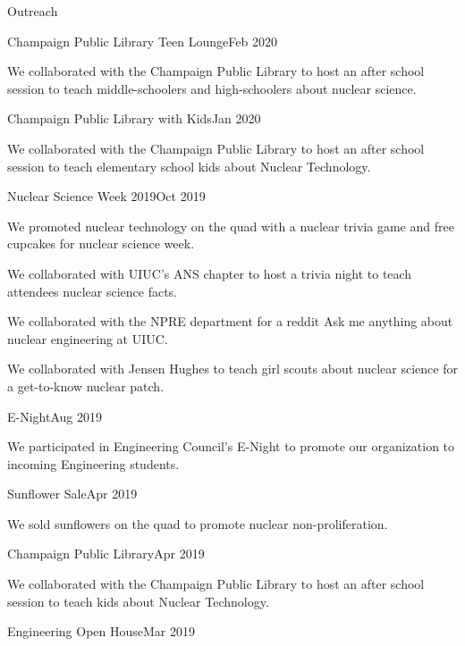 \documentclass{resume2} %
\begin{document}
\begin{rSection}{Outreach}
	\begin{rSubsection}{Champaign Public Library Teen Lounge}{Feb 2020}{}{}
		\item We collaborated with the Champaign Public Library to host
		an after school session to teach middle-schoolers and high-schoolers 
		about nuclear science. 
	\end{rSubsection}
	\begin{rSubsection}{Champaign Public Library with Kids}{Jan 2020}{}{}
		\item We collaborated with the Champaign Public Library to host
		an after school session to teach elementary school kids about Nuclear 
		Technology.
	\end{rSubsection}
	\begin{rSubsection}{Nuclear Science Week 2019}{Oct 2019}{}{}
		\item We promoted nuclear technology on the quad with a
		nuclear trivia game and free cupcakes for nuclear science week.
		\item We collaborated with UIUC's ANS chapter to host a trivia night to 
		teach attendees nuclear science facts. 
		\item We collaborated with the NPRE department for a reddit Ask me anything about nuclear engineering at UIUC.
		\item We collaborated with Jensen Hughes to teach girl scouts about nuclear science for a get-to-know nuclear patch. 
	\end{rSubsection}
	\begin{rSubsection}{E-Night}{Aug 2019}{}{}
		\item We participated in Engineering Council's E-Night to promote our
		organization to incoming Engineering students.
	\end{rSubsection}
	\begin{rSubsection}{Sunflower Sale}{Apr 2019}{}{}
		\item We sold sunflowers on the quad to promote nuclear non-proliferation.
	\end{rSubsection}
	\begin{rSubsection}{Champaign Public Library}{Apr 2019}{}{}
		\item We collaborated with the Champaign Public Library to host
		an after school session to teach kids about Nuclear Technology.
	\end{rSubsection}
	\begin{rSubsection}{Engineering Open House}{Mar 2019}{}{}

\end{rSubsection}
\end{rSection}
\end{document}
